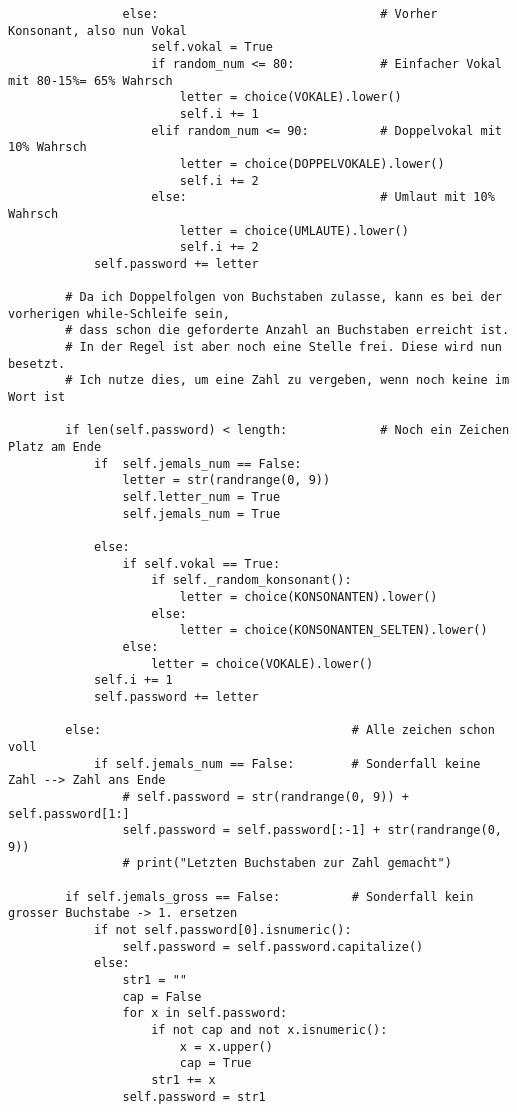 \documentclass[a4paper,10pt,ngerman]{scrartcl}
\begin{document}
\begin{lstlisting}
                else:                               # Vorher Konsonant, also nun Vokal
                    self.vokal = True
                    if random_num <= 80:            # Einfacher Vokal mit 80-15%= 65% Wahrsch
                        letter = choice(VOKALE).lower()
                        self.i += 1
                    elif random_num <= 90:          # Doppelvokal mit 10% Wahrsch
                        letter = choice(DOPPELVOKALE).lower()
                        self.i += 2
                    else:                           # Umlaut mit 10% Wahrsch
                        letter = choice(UMLAUTE).lower()
                        self.i += 2
            self.password += letter

        # Da ich Doppelfolgen von Buchstaben zulasse, kann es bei der vorherigen while-Schleife sein,
        # dass schon die geforderte Anzahl an Buchstaben erreicht ist.
        # In der Regel ist aber noch eine Stelle frei. Diese wird nun besetzt.
        # Ich nutze dies, um eine Zahl zu vergeben, wenn noch keine im Wort ist
        
        if len(self.password) < length:             # Noch ein Zeichen Platz am Ende        
            if  self.jemals_num == False:
                letter = str(randrange(0, 9))
                self.letter_num = True
                self.jemals_num = True

            else:
                if self.vokal == True:
                    if self._random_konsonant():
                        letter = choice(KONSONANTEN).lower()
                    else:
                        letter = choice(KONSONANTEN_SELTEN).lower()
                else:
                    letter = choice(VOKALE).lower()
            self.i += 1
            self.password += letter

        else:                                   # Alle zeichen schon voll
            if self.jemals_num == False:        # Sonderfall keine Zahl --> Zahl ans Ende
                # self.password = str(randrange(0, 9)) + self.password[1:]
                self.password = self.password[:-1] + str(randrange(0, 9))
                # print("Letzten Buchstaben zur Zahl gemacht")

        if self.jemals_gross == False:          # Sonderfall kein grosser Buchstabe -> 1. ersetzen
            if not self.password[0].isnumeric():
                self.password = self.password.capitalize()
            else:
                str1 = ""
                cap = False
                for x in self.password:
                    if not cap and not x.isnumeric():
                        x = x.upper()
                        cap = True
                    str1 += x
                self.password = str1


\end{lstlisting}
\end{document}

